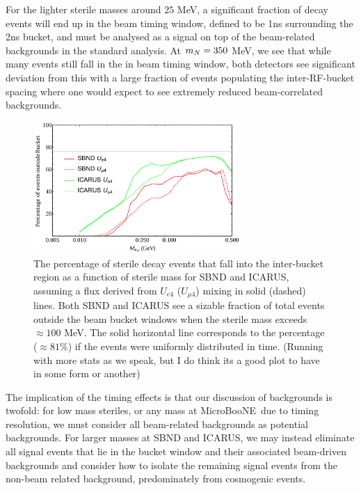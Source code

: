 \documentclass[11pt, a4paper]{article}
\def\muboone{MicroBooNE}
\def\ster{\ensuremath N}
\begin{document}
For the lighter sterile masses around $25$ MeV, a significant fraction of decay
events will end up in the beam timing window, defined to be 1ns surrounding the
2ns bucket, and must be analysed as a signal on top of the beam-related
backgrounds in the standard analysis. At $m_{\ster}=350$ MeV, we see that while
many events still fall in the in beam timing window, both detectors see
significant deviation from this with a large fraction of events populating the
inter-RF-bucket spacing where one would expect to see extremely reduced
beam-correlated backgrounds. \\ \begin{figure}[t]
%
\center
%
\includegraphics[width=0.7\textwidth]{figures/line_plots.pdf}
%
\caption{\label{fig:timing_line} The percentage of sterile decay events that
fall into the inter-bucket region as a function of sterile mass for SBND and
ICARUS, assuming a flux derived from $U_{e4}$ ($U_{\mu 4}$) mixing in solid
(dashed) lines. Both SBND and ICARUS see a sizable fraction of total events
outside the beam bucket windows when the sterile mass exceeds $\approx100$ MeV.
The solid horizontal line corresponds to the percentage ($\approx 81$\%) if the
events were uniformly distributed in time. (Running with more stats as we
speak, but I do think its a good plot to have in some form or another)  }
%
\end{figure}


The implication of the timing effects is that our discussion of backgrounds is
twofold: for low mass steriles, or any mass at \muboone\ due to timing
resolution, we must consider all beam-related backgrounds as potential
backgrounds. For larger masses at SBND and ICARUS, we may instead eliminate all
signal events that lie in the bucket window and their associated beam-driven
backgrounds and consider how to isolate the remaining signal events from the
non-beam related background, predominately from cosmogenic events.
\end{document}
